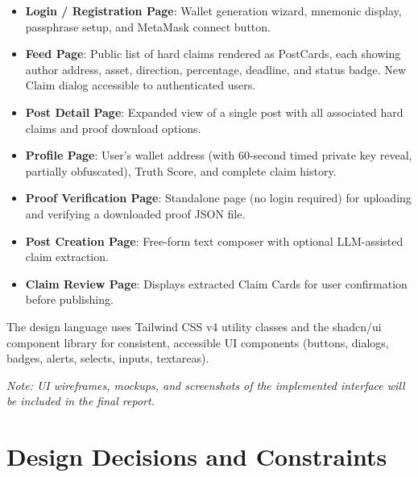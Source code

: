 \documentclass[a4paper,12pt]{report}
\begin{document}
\begin{itemize}
    \item \textbf{Login / Registration Page}: Wallet generation wizard, mnemonic display, passphrase setup, and MetaMask connect button.
    \item \textbf{Feed Page}: Public list of hard claims rendered as PostCards, each showing author address, asset, direction, percentage, deadline, and status badge. New Claim dialog accessible to authenticated users.
    \item \textbf{Post Detail Page}: Expanded view of a single post with all associated hard claims and proof download options.
    \item \textbf{Profile Page}: User's wallet address (with 60-second timed private key reveal, partially obfuscated), Truth Score, and complete claim history.
    \item \textbf{Proof Verification Page}: Standalone page (no login required) for uploading and verifying a downloaded proof JSON file.
    \item \textbf{Post Creation Page}: Free-form text composer with optional LLM-assisted claim extraction.
    \item \textbf{Claim Review Page}: Displays extracted Claim Cards for user confirmation before publishing.
\end{itemize}

The design language uses Tailwind CSS v4 utility classes and the shadcn/ui component library for consistent, accessible UI components (buttons, dialogs, badges, alerts, selects, inputs, textareas).

\textit{Note: UI wireframes, mockups, and screenshots of the implemented interface will be included in the final report.}

\section{Design Decisions and Constraints}
\end{document}
